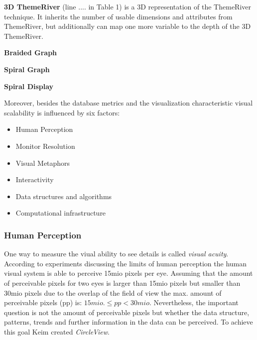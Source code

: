 \textbf{3D ThemeRiver} (line .... in Table 1) is a 3D representation of the ThemeRiver technique. It inherits the number of usable dimensions and attributes from ThemeRiver, but additionally can map one more variable to the depth of the 3D ThemeRiver.

\textbf{Braided Graph}

\textbf{Spiral Graph}

\cite{Weber2001}

\textbf{Spiral Display}
\cite{Carlis}



Moreover, besides the database metrics and the visualization characteristic visual scalability is influenced by six factors: 
\begin{itemize}
    \item Human Perception\cite{Keim2005,Deering1998}
    \item Monitor Resolution 
    \item Visual Metaphors
    \item Interactivity
    \item Data structures and algorithms
    \item Computational infrastructure
\end{itemize}

\subsubsection*{Human Perception} 
One way to measure the viual ability to see details is called \textit{visual acuity}\cite{Ware2012a}. 
According to experiments discussing the limits of human perception \cite{Deering1998} the human visual system is able to perceive 15mio pixels per eye. Assuming that the amount of perceivable pixels for two eyes is larger than 15mio pixels but smaller than 30mio pixels due to the overlap of the field of view the max. amount of perceivable pixels (pp) is:
\begin{math}
15 mio. \leq pp < 30 mio.
\end{math}
Nevertheless, the important question is not the amount of perceivable pixels but whether the data structure, patterns, trends and further information in the data can be perceived. To achieve this goal Keim\cite{Keim2005} created \textit{CircleView}.
